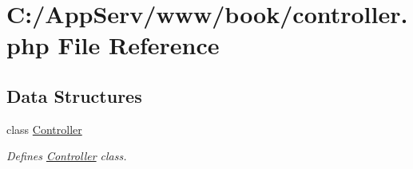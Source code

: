 \hypertarget{controller_8php}{
\section{C:/AppServ/www/book/controller.php File Reference}
\label{controller_8php}
}
\subsection*{Data Structures}
\begin{DoxyCompactItemize}
\item 
class \hyperlink{class_controller}{Controller}
\begin{DoxyCompactList}\small\item\em Defines \hyperlink{class_controller}{Controller} class. \item\end{DoxyCompactList}\end{DoxyCompactItemize}
